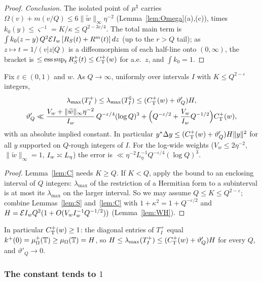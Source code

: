 \begin{proof}
\emph{Conclusion.} The isolated point of $\mu^\natural$ carries $\Omega(v)+m(v/Q)\le6\|\widetilde w\|_\infty\eta^{-2}$ (Lemma~\ref{lem:Omega}(a),(c)), times
$k_0(y)\le\varsigma^{-1}=K/\kappa\le Q^{2-3\varepsilon/4}$. The total main term is
$\int k_0(z-y)\,Q^2\mathcal{E}I_w\,[R_S(t)+R^m(t)]\,dz$ (up to the $r>Q$ tail); as $z\mapsto t=1/(v|z|Q)$ is a diffeomorphism of each
half-line onto $(0,\infty)$, the bracket is $\le\operatorname*{ess\,sup}_tR^+_S(t)\le C^{+}_{\mathrm T}(w)$ for a.e.\ $z$, and $\int k_0=1$.
\end{proof}

\begin{proposition}\label{prop:sharpLS}
Fix $\varepsilon\in(0,1)$ and $w$. As $Q\to\infty$, uniformly over intervals $I$ with $K\le Q^{2-\varepsilon}$ integers,
\begin{gather*}
 \lambda_{\max}(T^+_I)\le\lambda_{\max}(T^\natural_I)\le(C^{+}_{\mathrm T}(w)+\vartheta'_Q)H,\\
 \vartheta'_Q\ll\frac{V_w+\|\widetilde w\|_\infty\eta^{-2}}{I_w}\,Q^{-\varepsilon/4}(\log Q)^3+\Big(Q^{-\varepsilon/2}+\frac{V_w}{I_w}Q^{-1/2}\Big)C^{+}_{\mathrm T}(w),
\end{gather*}
with an absolute implied constant. In particular $y^*\Delta y\le(C^{+}_{\mathrm T}(w)+\vartheta_Q')H\|y\|^2$ for all $y$ supported on $Q$-rough
integers of $I$. For the log-wide weights ($V_w\le2\eta^{-2}$, $\|\widetilde w\|_\infty=1$, $I_w\asymp L_\eta$) the error is
$\ll\eta^{-2}L_\eta^{-1}Q^{-\varepsilon/4}(\log Q)^3$.
\end{proposition}

\begin{proof}
Lemma~\ref{lem:C} needs $K\ge Q$. If $K<Q$, apply the bound to an enclosing interval of $Q$ integers: $\lambda_{\max}$ of the restriction of a Hermitian form to a subinterval is at most its $\lambda_{\max}$ on the larger interval. So we may assume $Q\le K\le Q^{2-\varepsilon}$; combine Lemmas~\ref{lem:S} and~\ref{lem:C} with $1+\kappa^2=1+Q^{-\varepsilon/2}$ and
$H=\mathcal{E}I_w Q^2(1+O(V_wI_w^{-1}Q^{-1/2}))$ (Lemma~\ref{lem:WH}).
\end{proof}

In particular $C^{+}_{\mathrm T}(w)\ge1$: the diagonal entries of $T^+_I$ equal $k^+(0)=\mu_\Omega^+(\mathbb{T})\ge\mu_\Omega(\mathbb{T})=H$, so
$H\le\lambda_{\max}(T^+_I)\le(C^{+}_{\mathrm T}(w)+\vartheta'_Q)H$ for every $Q$, and $\vartheta'_Q\to0$.

\subsubsection*{The constant tends to $1$}

